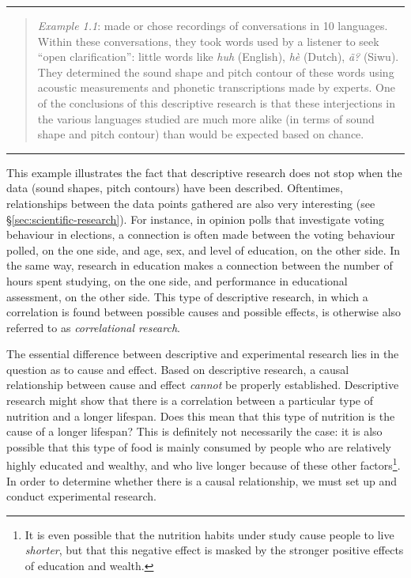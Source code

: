 \documentclass[
]{book}
\begin{document}
\begin{center}\rule{0.5\linewidth}{0.5pt}\end{center}

\begin{quote}
\emph{Example 1.1}: \citet{DTE13} made or chose recordings of conversations in 10 languages. Within these conversations, they took words used by a listener to seek ``open clarification'': little words like \emph{huh} (English), \emph{hè} (Dutch), \emph{ã?} (Siwu). They determined the sound shape and pitch contour of these words using acoustic measurements and phonetic transcriptions made by experts. One of the conclusions of this descriptive research is that these interjections in the various languages studied are much more alike (in terms of sound shape and pitch contour) than would be expected based on chance.
\end{quote}

\begin{center}\rule{0.5\linewidth}{0.5pt}\end{center}

This example illustrates the fact that descriptive research does not stop when the data (sound shapes, pitch contours) have been described. Oftentimes, relationships between the data points gathered are also very interesting (see §\ref{sec:scientific-research}). For instance, in opinion polls that investigate voting behaviour in elections, a connection is often made between the voting behaviour polled, on the one side, and age, sex, and level of education, on the other side. In the same way, research in education makes a connection between the number of hours spent studying, on the one side, and performance in educational assessment, on the other side. This type of descriptive research, in which a correlation is found between possible causes and possible effects, is otherwise also referred to as \emph{correlational research}.

The essential difference between descriptive and experimental research lies in the question as to cause and effect. Based on descriptive research, a causal relationship between cause and effect \emph{cannot} be properly established. Descriptive research might show that there is a correlation between a particular type of nutrition and a longer lifespan. Does this mean that this type of nutrition is the cause of a longer lifespan? This is definitely not necessarily the case: it is also possible that this type of food is mainly consumed by people who are relatively highly educated and wealthy, and who live longer because of these other factors\footnote{It is even possible that the nutrition habits under study cause people to live \emph{shorter}, but that this negative effect is masked by the stronger positive effects of education and wealth.}. In order to determine whether there is a causal relationship, we must set up and conduct experimental research.
\end{document}
